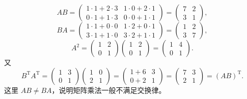 \[
AB=\begin{pmatrix}1\cdot1+2\cdot3&1\cdot0+2\cdot1\\0\cdot1+1\cdot3&0\cdot0+1\cdot1\end{pmatrix}
=\begin{pmatrix}7&2\\3&1\end{pmatrix},
\]
\[
BA=\begin{pmatrix}1\cdot1+0\cdot0&1\cdot2+0\cdot1\\3\cdot1+1\cdot0&3\cdot2+1\cdot1\end{pmatrix}
=\begin{pmatrix}1&2\\3&7\end{pmatrix},
\]
\[
A^2=\begin{pmatrix}1&2\\0&1\end{pmatrix}\begin{pmatrix}1&2\\0&1\end{pmatrix}
=\begin{pmatrix}1&4\\0&1\end{pmatrix}.
\]
又
\[
B^{\mathrm T}A^{\mathrm T}
=\begin{pmatrix}1&3\\0&1\end{pmatrix}\begin{pmatrix}1&0\\2&1\end{pmatrix}
=\begin{pmatrix}1+6&3\\0+2&1\end{pmatrix}
=\begin{pmatrix}7&3\\2&1\end{pmatrix}
=(AB)^{\mathrm T}.
\]
这里 \(AB\neq BA\)，说明矩阵乘法一般不满足交换律。

\else \answerarea[8] \fi%

